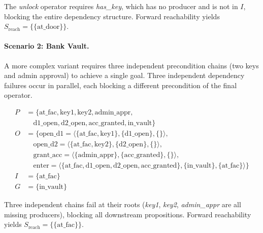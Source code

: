 The \textit{unlock} operator requires \textit{has\_key}, which has no producer and is not in $I$, blocking the entire dependency structure. Forward reachability yields $S_{\text{reach}} = \{\{\text{at\_door}\}\}$.

\paragraph{Scenario 2: Bank Vault.}

A more complex variant requires three independent precondition chains (two keys and admin approval) to achieve a single goal. Three independent dependency failures occur in parallel, each blocking a different precondition of the final operator.

\begin{align*}
  P & = \{\text{at\_fac}, \text{key1}, \text{key2}, \text{admin\_appr},                                                                                           \\
    & \quad \text{d1\_open}, \text{d2\_open}, \text{acc\_granted}, \text{in\_vault}\}                                                                             \\
  O & = \{ \text{open\_d1} = \langle \{\text{at\_fac}, \text{key1}\}, \{\text{d1\_open}\}, \{\} \rangle,                                                          \\
    & \quad \text{open\_d2} = \langle \{\text{at\_fac}, \text{key2}\}, \{\text{d2\_open}\}, \{\} \rangle,                                                         \\
    & \quad \text{grant\_acc} = \langle \{\text{admin\_appr}\}, \{\text{acc\_granted}\}, \{\} \rangle,                                                            \\
    & \quad \text{enter} = \langle \{\text{at\_fac}, \text{d1\_open}, \text{d2\_open}, \text{acc\_granted}\}, \{\text{in\_vault}\}, \{\text{at\_fac}\} \rangle \} \\
  I & = \{\text{at\_fac}\}                                                                                                                                        \\
  G & = \{\text{in\_vault}\}
\end{align*}

Three independent chains fail at their roots (\textit{key1}, \textit{key2}, \textit{admin\_appr} are all missing producers), blocking all downstream propositions. Forward reachability yields $S_{\text{reach}} = \{\{\text{at\_fac}\}\}$.

